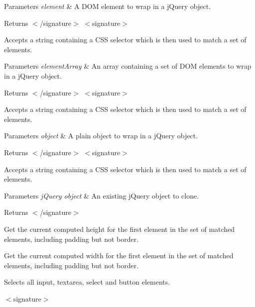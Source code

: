 \begin{DoxyParams}{Parameters}
{\em element} & A D\+OM element to wrap in a j\+Query object.\\
\hline
\end{DoxyParams}
\begin{DoxyReturn}{Returns}
$<$/signature$>$ $<$signature$>$ 

Accepts a string containing a C\+SS selector which is then used to match a set of elements.
\end{DoxyReturn}

\begin{DoxyParams}{Parameters}
{\em element\+Array} & An array containing a set of D\+OM elements to wrap in a j\+Query object.\\
\hline
\end{DoxyParams}
\begin{DoxyReturn}{Returns}
$<$/signature$>$ $<$signature$>$ 

Accepts a string containing a C\+SS selector which is then used to match a set of elements.
\end{DoxyReturn}

\begin{DoxyParams}{Parameters}
{\em object} & A plain object to wrap in a j\+Query object.\\
\hline
\end{DoxyParams}
\begin{DoxyReturn}{Returns}
$<$/signature$>$ $<$signature$>$ 

Accepts a string containing a C\+SS selector which is then used to match a set of elements.
\end{DoxyReturn}

\begin{DoxyParams}{Parameters}
{\em j\+Query object} & An existing j\+Query object to clone.\\
\hline
\end{DoxyParams}
\begin{DoxyReturn}{Returns}
$<$/signature$>$ 

Get the current computed height for the first element in the set of matched elements, including padding but not border.

Get the current computed width for the first element in the set of matched elements, including padding but not border.

Selects all input, textarea, select and button elements.
\end{DoxyReturn}
$<$signature$>$ 

